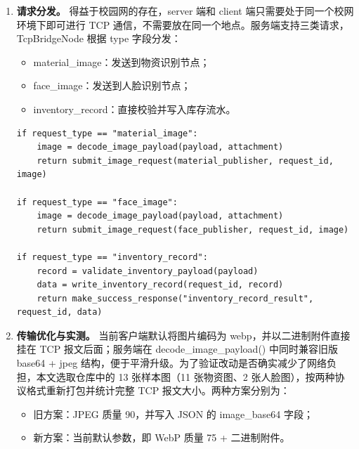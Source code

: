 \documentclass[12pt]{article}
\newcommand{\code}[1]{{\ttfamily #1}}
\begin{document}
\begin{enumerate}
\begin{lstlisting}[caption={TCP 消息收发（两端共用的 \code{tcp\_protocol.py}）},label={lst:tcp-protocol}]
def send_message(sock, payload, attachment=b""):
    encoded = json.dumps(payload, ensure_ascii=False).encode("utf-8")
    sock.sendall(MESSAGE_PREFIX.pack(len(encoded), len(attachment))
                 + encoded + attachment)
\end{lstlisting}

	\item \textbf{请求分发。} 得益于校园网的存在，server 端和 client 端只需要处于同一个校网环境下即可进行 TCP 通信，不需要放在同一个地点。服务端支持三类请求，\code{TcpBridgeNode} 根据 \code{type} 字段分发：

	      \begin{itemize}
		      \item \code{material\_image}：发送到物资识别节点；
		      \item \code{face\_image}：发送到人脸识别节点；
		      \item \code{inventory\_record}：直接校验并写入库存流水。
	      \end{itemize}

	      \begin{lstlisting}[caption={TCP 网桥分发逻辑},label={lst:tcp-bridge-dispatch}]
if request_type == "material_image":
    image = decode_image_payload(payload, attachment)
    return submit_image_request(material_publisher, request_id, image)

if request_type == "face_image":
    image = decode_image_payload(payload, attachment)
    return submit_image_request(face_publisher, request_id, image)

if request_type == "inventory_record":
    record = validate_inventory_payload(payload)
    data = write_inventory_record(request_id, record)
    return make_success_response("inventory_record_result", request_id, data)
\end{lstlisting}

	\item \textbf{传输优化与实测。} 当前客户端默认将图片编码为 \code{webp}，并以二进制附件直接挂在 TCP 报文后面；服务端在 \code{decode\_image\_payload()} 中同时兼容旧版 \code{base64 + jpeg} 结构，便于平滑升级。为了验证改动是否确实减少了网络负担，本文选取仓库中的 13 张样本图（11 张物资图、2 张人脸图），按两种协议格式重新打包并统计完整 TCP 报文大小。两种方案分别为：

	      \begin{itemize}
		      \item 旧方案：JPEG 质量 90，并写入 JSON 的 \code{image\_base64} 字段；
		      \item 新方案：当前默认参数，即 WebP 质量 75 + 二进制附件。
	      \end{itemize}


\end{enumerate}
\end{document}
